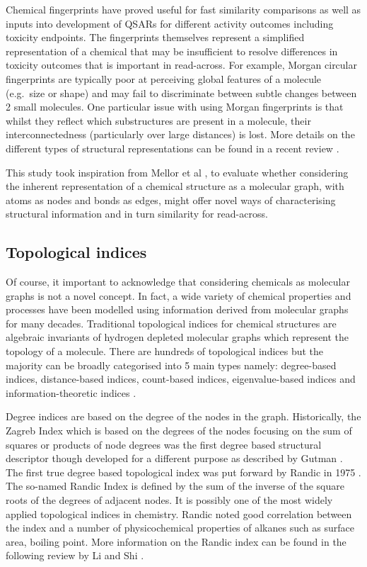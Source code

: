\documentclass[
  super,
  preprint,
  3p]{elsarticle}
\begin{document}
Chemical fingerprints have proved useful for fast similarity comparisons
as well as inputs into development of QSARs for different activity
outcomes including toxicity endpoints. The fingerprints themselves
represent a simplified representation of a chemical that may be
insufficient to resolve differences in toxicity outcomes that is
important in read-across. For example, Morgan circular fingerprints are
typically poor at perceiving global features of a molecule (e.g.~size or
shape) and may fail to discriminate between subtle changes between 2
small molecules. One particular issue with using Morgan fingerprints is
that whilst they reflect which substructures are present in a molecule,
their interconnectedness (particularly over large distances) is lost.
More details on the different types of structural representations can be
found in a recent review \citep{Banerjee_2024}.

This study took inspiration from Mellor et al
\citep{mellor_molecular_2019}, to evaluate whether considering the
inherent representation of a chemical structure as a molecular graph,
with atoms as nodes and bonds as edges, might offer novel ways of
characterising structural information and in turn similarity for
read-across.

\subsection{Topological indices}\label{topological-indices}

Of course, it important to acknowledge that considering chemicals as
molecular graphs is not a novel concept. In fact, a wide variety of
chemical properties and processes have been modelled using information
derived from molecular graphs for many decades. Traditional topological
indices for chemical structures are algebraic invariants of hydrogen
depleted molecular graphs which represent the topology of a molecule.
There are hundreds of topological indices but the majority can be
broadly categorised into 5 main types namely: degree-based indices,
distance-based indices, count-based indices, eigenvalue-based indices
and information-theoretic indices \citep{Alameri_2021}.

Degree indices are based on the degree of the nodes in the graph.
Historically, the Zagreb Index which is based on the degrees of the
nodes focusing on the sum of squares or products of node degrees was the
first degree based structural descriptor though developed for a
different purpose as described by Gutman \citep{gutman_2013}. The first
true degree based topological index was put forward by Randic in 1975
\citep{randic_1975}. The so-named Randic Index is defined by the sum of
the inverse of the square roots of the degrees of adjacent nodes. It is
possibly one of the most widely applied topological indices in
chemistry. Randic noted good correlation between the index and a number
of physicochemical properties of alkanes such as surface area, boiling
point. More information on the Randic index can be found in the
following review by Li and Shi \citep{li_2008}.
\end{document}
